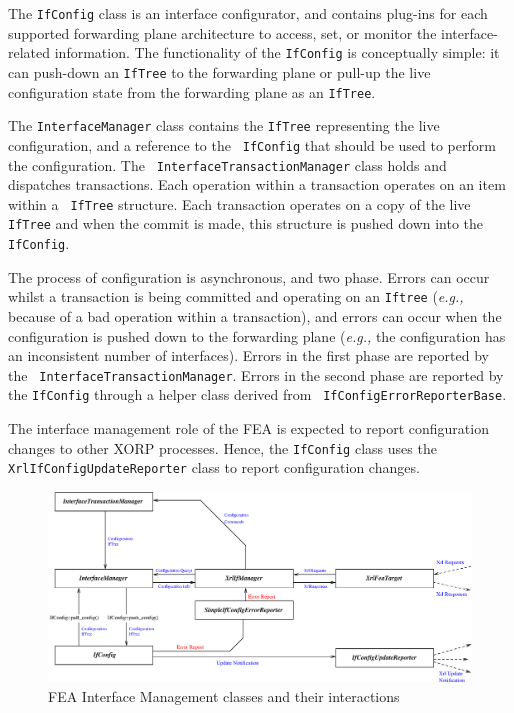 \documentclass[11pt]{article}
\newcommand{\eg}{\emph{e.g.,}\xspace}
\begin{document}
The {\tt IfConfig} class is an interface configurator, and contains
plug-ins for each supported forwarding plane architecture to
access, set, or monitor the interface-related information.
The functionality of the {\tt IfConfig} is conceptually simple: it can
push-down an {\tt IfTree} to the forwarding plane or pull-up the live
configuration state from the forwarding plane as an {\tt IfTree}.

The {\tt InterfaceManager} class contains the {\tt IfTree}
representing the live configuration, and a reference to the {\tt
IfConfig} that should be used to perform the configuration.  The {\tt
InterfaceTransactionManager} class holds and dispatches transactions.
Each operation within a transaction operates on an item within a {\tt
IfTree} structure.  Each transaction operates on a copy of the live
{\tt IfTree} and when the commit is made, this structure is pushed
down into the {\tt IfConfig}.

The process of configuration is asynchronous, and two phase.  Errors
can occur whilst a transaction is being committed and operating on an
{\tt Iftree} (\eg because of a bad operation within a transaction), and
errors can occur when the configuration is pushed down to the
forwarding plane (\eg the configuration has an inconsistent number of
interfaces).  Errors in the first phase are reported by the {\tt
InterfaceTransactionManager}.  Errors in the second phase are reported
by the {\tt IfConfig} through a helper class derived from {\tt
IfConfigErrorReporterBase}.

The interface management role of the FEA is expected to report
configuration changes to other XORP processes.  Hence,
the {\tt IfConfig} class uses the {\tt XrlIfConfigUpdateReporter}
class to report configuration changes.

\clearpage
\begin{figure}[htbp]
  \begin{center}
    \includegraphics[angle=90,height=0.90\textheight]{figs/ifi}
    \caption{FEA Interface Management classes and their interactions}
    \label{fig:ifi}
  \end{center}
\end{figure}
\clearpage
\end{document}
